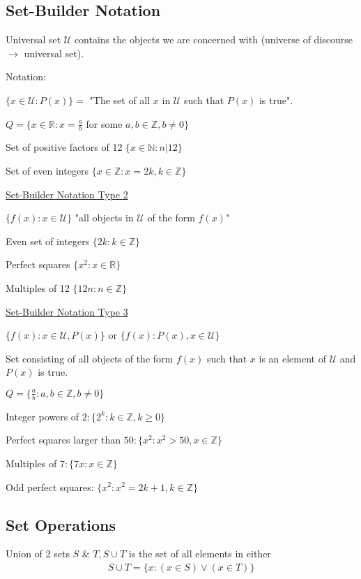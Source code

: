 \documentclass{article}
\begin{document}
\subsection{Set-Builder Notation}

Universal set $\mathcal{U}$ contains the objects we are concerned with (universe of discourse $\rightarrow$ universal set). 

Notation:

$\{x \in \mathcal{U}: P(x)\} = $ "The set of all $x$ in $\mathcal{U}$ such that $P(x)$ is true". 

$Q = \{x \in \mathbb{R}:x = \frac{a}{b}$ for some $a,b \in \mathbb{Z}, b \ne 0\}$

Set of positive factors of 12 $\{x \in \mathbb{N}: n \vert 12\}$

Set of even integers $\{x \in \mathbb{Z} : x = 2k, k \in \mathbb{Z}\}$

\underline{Set-Builder Notation Type 2}

$\{f(x): x \in \mathcal{U}\}$ "all objects in $\mathcal{U}$ of the form $f(x)$"

Even set of integers $\{2k: k \in \mathbb{Z}\}$

Perfect squares $\{x^2: x \in \mathbb{R}\}$

Multiples of 12 $\{12n: n \in \mathbb{Z}\}$

\underline{Set-Builder Notation Type 3}

$\{f(x): x \in \mathcal{U}, P(x)\}$ or $\{f(x): P(x), x \in \mathcal{U}\}$

Set consisting of all objects of the form $f(x)$ such that $x$ is an element of $\mathcal{U}$ and $P(x)$ is true.

$Q = \{\frac{a}{b}: a,b \in \mathbb{Z}, b \ne 0\}$

Integer powers of $2: \{2^k : k \in \mathbb{Z}, k \ge 0\}$

Perfect squares larger than $50: \{x^2: x^2 > 50, x \in \mathbb{Z}\}$

Multiples of $7: \{7x: x \in \mathbb{Z}\}$

Odd perfect squares: $\{x^2 : x^2 = 2k+1, k \in \mathbb{Z}\}$

\subsection{Set Operations}

Union of 2 sets $S$ \& $T, S \cup T$ is the set of all elements in either
\begin{align*}
    S \cup T = \{x: (x \in S) \vee (x \in T)\}
\end{align*}
\end{document}
